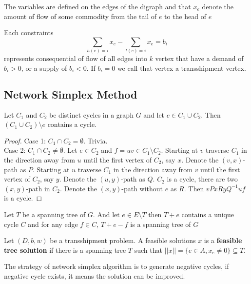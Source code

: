             The variables are defined on the edges of the digraph and that $x_e$ denote the amount of flow of some commodity from the tail of $e$ to the head of $e$

            Each constraints
            \begin{equation*}
                \sum_{h(e) = i} x_e - \sum_{t(e) = i}x_e = b_i
            \end{equation*}
            represents consequential of flow of all edges into $k$ vertex that have a demand of $b_i > 0$, or a supply of $b_i < 0$. If $b_i = 0$ we call that vertex a transshipment vertex.

        \subsection{Network Simplex Method}
            \begin{lemma}
                Let $C_1$ and $C_2$ be distinct cycles in a graph $G$ and let $e\in C_1 \cup C_2$. Then $(C_1 \cup C_2) \setminus e$ contains a cycle.
            \end{lemma}

            \begin{proof}
                Case 1: $C_1 \cap C_2 = \emptyset$. Trivia.\\
                Case 2: $C_1 \cap C_2 \neq \emptyset$. Let $e\in C_2$ and $f=uv \in C_1 \setminus C_2$. Starting at $v$ traverse $C_1$ in the direction away from $u$ until the first vertex of $C_2$, say $x$. Denote the $(v, x)$-path as $P$. Starting at $u$ traverse $C_1$ in the direction away from $v$ until the first vertex of $C_2$, say $y$. Denote the $(u, y)$-path as $Q$. $C_2$ is a cycle, there are two $(x, y)$-path in $C_2$. Denote the $(x, y)$-path without $e$ as $R$. Then $vPxRyQ^{-1}uf$ is a cycle.
            \end{proof}

            \begin{theorem}
                Let $T$ be a spanning tree of $G$. And let $e\in E\setminus T$ then $T+e$ contains a unique cycle $C$ and for any edge $f\in C$, $T+e-f$ is a spanning tree of $G$
            \end{theorem}

            Let $(D, b, w)$ be a transshipment problem. A feasible solutions $x$ is a \textbf{feasible tree solution} if there is a spanning tree $T$ such that $||x|| = \{e\in A, x_e\neq 0\} \subseteq T$.

            The strategy of network simplex algorithm is to generate negative cycles, if negative cycle exists, it means the solution can be improved.

